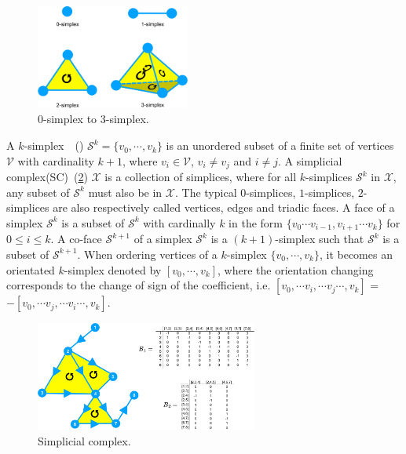 \begin{figure}[!h]
    \centering
    \includegraphics[width=0.45\textwidth]{Simplex/fig}
    \vspace{0.1cm}
    \caption[0-simplex to 3-simplex.]{0-simplex to 3-simplex.}
    \label{fig:simplex}
\end{figure}

A $k$-simplex~\citep{schaub2021signal}~() $\mathcal{S}^k = \{{v}_0,\cdots,{v}_k \}$ is an unordered subset of a finite set of vertices $\mathcal{V}$ with cardinality $k + 1$, where $v_i\in \mathcal{V}$, $v_i \neq v_j$ and $i \neq j$. A simplicial complex(SC)~(\ref{fig:sc}) $\mathcal{X}$ is a collection of simplices, where for all $k$-simplices $\mathcal{S}^k$ in $\mathcal{X}$, any subset of $\mathcal{S}^k$ must also be in $\mathcal{X}$. The typical $0$-simplices, $1$-simplices, $2$-simplices are also respectively called vertices, edges and triadic faces. A face of a simplex $\mathcal{S}^k$ is a subset of $\mathcal{S}^k$  with cardinally $k$ in the form $\{v_0 \cdots v_{i-1}, v_{i+1}\cdots v_k\}$ for $0 \leq i \leq k$. A co-face $\mathcal{S}^{k+1}$ of a simplex $\mathcal{S}^k$ is a $(k + 1)$-simplex such that $\mathcal{S}^k$ is a subset of $\mathcal{S}^{k+1}$.  When ordering vertices of a $k$-simplex $\{{v}_0,\cdots,{v}_k \}$, it becomes an orientated $k$-simplex denoted by $[{v}_0,\cdots,{v}_k ]$, where the orientation changing corresponds to the change of sign of the coefficient, i.e. $[{v}_0,\cdots {v}_i, \cdots {v}_j\cdots,{v}_k ]$ = $-[{v}_0,\cdots {v}_j, \cdots {v}_i\cdots,{v}_k ]$. 


\begin{figure}[!h]
    \centering
    \includegraphics[width=0.65\textwidth]{Simplicial_Complex/fig}
    \vspace{0.1cm}
    \caption[Simplicial complex.]{Simplicial complex.}
    \label{fig:sc}
\end{figure}


